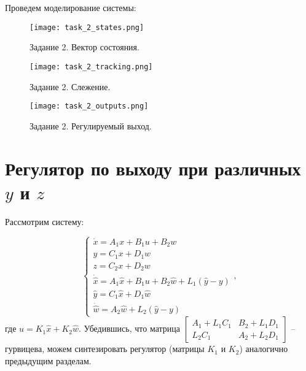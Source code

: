 Проведем моделирование системы:

\begin{figure}[h]
    \centering
    \texttt{[image: task\_2\_states.png]}
    \caption{\label{fig:task4_3_2}Задание 2. Вектор состояния.}
\end{figure}

\begin{figure}[]
    \centering
    \texttt{[image: task\_2\_tracking.png]}
    \caption{\label{fig:task4_3_2}Задание 2. Слежение.}
\end{figure}

\begin{figure}[]
    \centering
    \texttt{[image: task\_2\_outputs.png]}
    \caption{\label{fig:task4_3_2}Задание 2. Регулируемый выход.}
\end{figure}
\pagebreak

\section{Регулятор по выходу при различных $y$ и $z$}

Рассмотрим систему:

\begin{equation}
    \begin{cases}
        \dot{x} = A_1x + B_1u + B_2w \\
        y = C_1x + D_1w \\
        z = C_2x + D_2w \\
        \dot{\hat{x}} = A_1\hat{x} + B_1u + B_2\hat{w} + L_1(\hat{y} - y) \\
        \hat{y} = C_1\hat{x} + D_1\hat{w} \\
        \dot{\hat{w}} = A_2\hat{w} + L_2(\hat{y} - y)
    \end{cases},
\end{equation}
где $u = K_1\hat{x} + K_2\hat{w}$. Убедившись, что матрица
$\begin{bmatrix}
    A_1 + L_1C_1 & B_2 + L_1D_1 \\
    L_2C_1 & A_2 + L_2D_1
\end{bmatrix}$ -- гурвицева, можем синтезировать регулятор (матрицы $K_1$ и $K_2$) аналогично предыдущим разделам.

